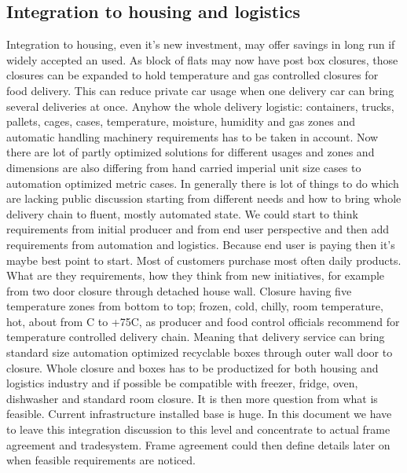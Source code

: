 \subsection{Integration to housing and logistics}
\label{integration}
Integration to housing, even it's new investment, may offer savings in long
run if widely accepted an used. As block of flats may now have post box
closures, those closures can be expanded to hold temperature and gas
controlled closures for food delivery. This can reduce private car usage when
one delivery car can bring several deliveries at once. Anyhow the whole
delivery logistic: containers, trucks, pallets, cages, cases, temperature,
moisture, humidity and gas  zones and automatic handling machinery
requirements has to be taken in account. Now there are lot of partly optimized
solutions for different usages and zones and dimensions are also differing
from hand carried imperial unit size cases to automation optimized metric
cases. In generally there is lot of things to do which are lacking public
discussion starting from different needs and how to bring whole delivery chain
to fluent, mostly automated state. We could start to think requirements from
initial producer and from end user perspective and then add requirements from
automation and logistics. Because end user is paying then it's maybe best
point to start. Most of customers purchase most often daily products. What are
they requirements, how they think  from new initiatives, for example from two
door closure through detached house wall. Closure having five temperature
zones from bottom to top; frozen, cold, chilly, room temperature, hot, about
from \textdegree C to +75\textdegree C, as producer and food
control officials recommend for temperature controlled delivery chain.
Meaning that delivery service can bring standard size automation optimized
recyclable boxes through outer wall door to closure. Whole closure and boxes
has to be productized for both housing and logistics industry and if possible
be compatible with freezer, fridge, oven, dishwasher and standard room
closure. It is then more question from what is feasible. Current
infrastructure installed base is huge. In this document we have to leave this
integration discussion to this level and concentrate to actual frame
agreement and tradesystem. Frame agreement could then define details later on
when feasible requirements are noticed. 

